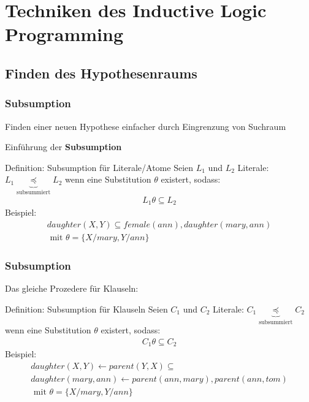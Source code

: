 \section{Techniken des Inductive Logic Programming}

\subsection{Finden des Hypothesenraums}
\begin{frame}
	\frametitle{Subsumption}
	Finden einer neuen Hypothese einfacher durch Eingrenzung von Suchraum

	Einführung der \textbf{Subsumption}
	\begin{block}{Definition: Subsumption für Literale/Atome}
		Seien $L_1$ und $L_2$ Literale: $L_1 \underbrace{\preceq}_{\text{subsummiert}} L_2$
		wenn eine Substitution $\theta$ existert, sodass:
		\begin{align*}
			 L_1 \theta \subseteq L_2
		\end{align*}
		Beispiel:
		\begin{align*}
			 daughter(X, Y)  \subseteq female(ann), daughter(mary, ann)\\\text{  mit  } \theta = \{X/mary, Y/ann\}
		\end{align*}
	\end{block}
\end{frame}
\begin{frame}
	\frametitle{Subsumption}
	Das gleiche Prozedere für Klauseln:
	\begin{block}{Definition: Subsumption für Klauseln}
		Seien $C_1$ und $C_2$ Literale: $C_1 \underbrace{\preceq}_{\text{subsummiert}} C_2$
		wenn eine Substitution $\theta$ existert, sodass:
		\begin{align*}
			 C_1 \theta \subseteq C_2
		\end{align*}
		Beispiel:
		\begin{gather*}
			 daughter(X, Y) \leftarrow parent(Y,X) \subseteq\\
			 daughter(mary, ann) \leftarrow parent(ann, mary), parent(ann, tom)\\
			 \text{  mit  } \theta = \{X/mary, Y/ann\}
		\end{gather*}
	\end{block}
\end{frame}

